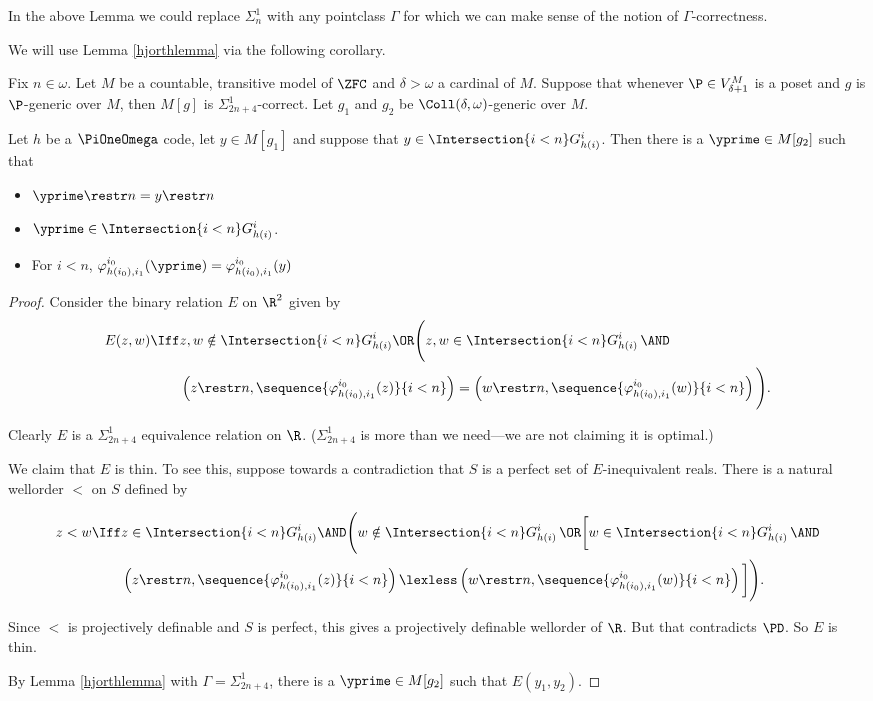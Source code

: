\documentclass[oneside,12pt]{amsart}
\begin{document}
\begin{note} In the above Lemma we could replace $\Sigma^1_n$ with any
pointclass $\Gamma$ for which we can make sense of the notion of
$\Gamma$-correctness.
\end{note}

We will use Lemma \ref{hjorthlemma} via the following corollary.

\begin{corollary}
\label{hjorthcorollary} Fix $n\in\omega$.
Let $M$ be a countable, transitive model of $\ZFC$ and  $\delta>\omega$ a cardinal of $M$.
Suppose that whenever $\P\in V^M_{\delta+1}$ is a poset and $g$ is $\P$-generic over $M$, then
$M[g]$ is $\Sigma^1_{2n+4}$-correct. Let $g_1$ and $g_2$ be $\Coll(\delta,\omega)$-generic over $M$.

Let $h$ be a $\PiOneOmega$ code, let $y\in M[g_1]$ and suppose that $y\in \Intersection{i<n} G^i_{h(i)}$. Then there is
a $\yprime \in M[g_2]$ such that
\begin{itemize}
\item $\yprime \restr n = y \restr n$
\item $\yprime\in \Intersection{i<n} G^i_{h(i)}$.
\item For $i<n$, $\varphi^{i_0}_{h(i_0),i_1}(\yprime) = \varphi^{i_0}_{h(i_0),i_1}(y)$
\end{itemize}
\end{corollary}
\begin{proof}
Consider the binary relation $E$ on $\R^2$ given by
\begin{align*}
E(z,w) \Iff &z,w\notin \Intersection{i<n} G^i_{h(i)} \OR \Bigg( z,w \in \Intersection{i<n} G^i_{h(i)} \, \AND  \\
&\left( z\restr n, \sequence{\varphi^{i_0}_{h(i_0),i_1}(z)}{i<n}\right) = \left( w\restr n, \sequence{\varphi^{i_0}_{h(i_0),i_1}(w)}{i<n}\right) \Bigg).
\end{align*}

Clearly $E$ is a $\Sigma^1_{2n+4}$ equivalence relation on $\R$. ($\Sigma^1_{2n+4}$ is more than we
need---we are not claiming it is optimal.)

We claim that $E$ is thin. To see this, suppose towards a contradiction that $S$ is a perfect set of $E$-inequivalent reals.
There is a natural wellorder $<$ on $S$ defined by

\begin{align*}
z<w \Iff &z\in \Intersection{i<n} G^i_{h(i)} \AND \Bigg( w \notin \Intersection{i<n} G^i_{h(i)} \, \OR   \bigg[w \in \Intersection{i<n} G^i_{h(i)} \, \AND\\
&\left( z\restr n, \sequence{\varphi^{i_0}_{h(i_0),i_1}(z)}{i<n}\right) \lexless \left( w\restr n, \sequence{\varphi^{i_0}_{h(i_0),i_1}(w)}{i<n}\right) \bigg]\Bigg).
\end{align*}

Since $<$ is projectively definable and $S$ is perfect, this gives a projectively definable wellorder of $\R$. But that
contradicts $\PD$. So $E$ is thin.

By Lemma \ref{hjorthlemma} with $\Gamma=\Sigma^1_{2n+4}$, there is a
$\yprime\in M[g_2]$ such that $E(y_1, y_2)$.
\end{proof}
\end{document}
